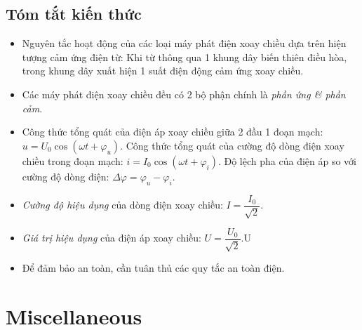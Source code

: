 \documentclass{article}
\begin{document}
\subsection{Tóm tắt kiến thức}

\begin{itemize}
	\item Nguyên tắc hoạt động của các loại máy phát điện xoay chiều dựa trên hiện tượng cảm ứng điện từ: Khi từ thông qua 1 khung dây biến thiên điều hòa, trong khung dây xuất hiện 1 suất điện động cảm ứng xoay chiều.
	\item Các máy phát điện xoay chiều đều có 2 bộ phận chính là {\it phần ứng \& phần cảm}.
	\item Công thức tổng quát của điện áp xoay chiều giữa 2 đầu 1 đoạn mạch: $u = U_0\cos(\omega t + \varphi_u)$. Công thức tổng quát của cường độ dòng điện xoay chiều trong đoạn mạch: $i = I_0\cos(\omega t + \varphi_i)$. Độ lệch pha của điện áp so với cường độ dòng điện: $\Delta\varphi = \varphi_u - \varphi_i$.
	\item {\it Cường độ hiệu dụng} của dòng điện xoay chiều: $I = \dfrac{I_0}{\sqrt{2}}$.
	\item {\it Giá trị hiệu dụng} của điện áp xoay chiều: $U = \dfrac{U_0}{\sqrt{2}}$.U
	\item Để đảm bảo an toàn, cần tuân thủ các quy tắc an toàn điện.
\end{itemize}


\section{Miscellaneous}


\printbibliography[heading=bibintoc]
	
\end{document}
